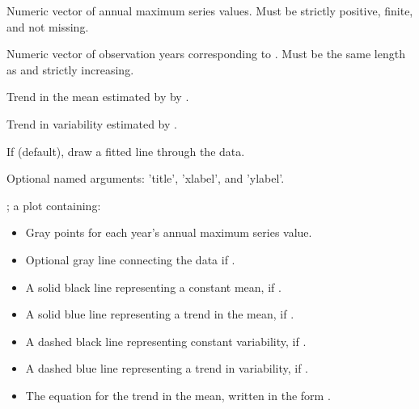 \documentclass[a4paper]{book}
\begin{document}
\begin{Arguments}
\begin{ldescription}
\item[\code{data}] Numeric vector of annual maximum series values.
Must be strictly positive, finite, and not missing.

\item[\code{years}] Numeric vector of observation years corresponding to .
Must be the same length as  and strictly increasing.

\item[\code{mean\_trend}] Trend in the mean estimated by by .

\item[\code{variability\_trend}] Trend in variability estimated by .

\item[\code{show\_line}] If  (default), draw a fitted line through the data.

\item[\code{...}] Optional named arguments: 'title', 'xlabel', and 'ylabel'.
\end{ldescription}
\end{Arguments}
%
\begin{Value}
; a plot containing:
\begin{itemize}

\item{} Gray points for each year’s annual maximum series value.
\item{} Optional gray line connecting the data if .
\item{} A solid black line representing a constant mean, if .
\item{} A solid blue line representing a trend in the mean, if .
\item{} A dashed black line representing constant variability, if .
\item{} A dashed blue line representing a trend in variability, if .
\item{} The equation for the trend in the mean, written in the form .

\end{itemize}

\end{Value}
\end{document}
